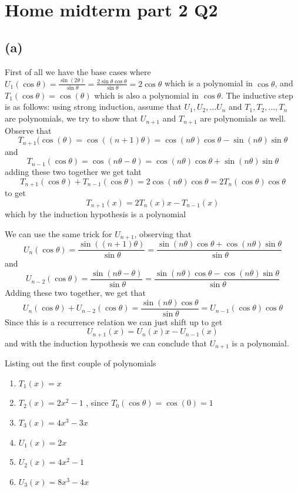 \documentclass[12pt]{article}
\begin{document}
\section*{Home midterm part 2 Q2}
\subsection*{(a)}
First of all we have the base cases where $U_1 (\cos \theta) = \frac{\sin(2 \theta)}{\sin \theta} = \frac{2 \sin \theta \cos \theta}{\sin \theta} = 2 \cos \theta$ which  is a polynomial in $\cos \theta$, and $T_1( \cos \theta) = \cos(\theta)$ which is also a polynomial in $\cos \theta$. The inductive step is as follows: using strong induction, assume that $U_1, U_2, \ldots U_n$ and $T_1, T_2, \ldots, T_n$ are polynomials, we try to show that $U_{n+1}$ and $T_{n+1}$ are polynomials as well. Observe that 
$$
T_{n+1}(\cos(\theta) = \cos ((n+1)\theta) = \cos(n\theta)\cos\theta - \sin(n\theta)\sin\theta
$$
and 
$$T_{n-1}(\cos\theta) = \cos(n\theta - \theta) = \cos(n\theta)\cos\theta + \sin(n\theta)\sin\theta$$
adding these two together we get taht 
$$ T_{n+1}(\cos \theta) + T_{n-1} (\cos \theta) = 2 \cos( n \theta)\cos\theta = 2 T_{n}(\cos \theta)\cos\theta$$
to get
$$T_{n+1} (x) = 2T_n (x) x - T_{n-1}(x)$$
which by the induction hypothesis is a polynomial

We can use the same trick for $U_{n+1}$, observing that 
$$U_{n}(\cos\theta) = \frac{\sin((n+1)\theta)}{\sin\theta} = \frac{\sin(n\theta) \cos \theta + \cos(n\theta)\sin\theta}{\sin\theta}$$
and 
$$U_{n-2}(\cos\theta) = \frac{\sin(n\theta - \theta)}{\sin\theta} = \frac{\sin(n \theta)\cos\theta - \cos(n\theta)\sin\theta}{\sin\theta}
$$
Adding these two together, we get that 
$$U_n(\cos\theta) + U_{n-2}(\cos\theta) = \frac{\sin(n\theta)\cos\theta}{\sin\theta} = U_{n-1}(\cos\theta)\cos\theta$$
Since this is a recurrence relation we can just shift up to get
$$U_{n+1}(x)  = U_n(x)x - U_{n-1}(x)$$
and with the induction hypothesis we can conclude that $U_{n+1}$ is a polynomial.


Listing out the first couple of polynomials
\begin{enumerate}
	\item $T_1(x) = x$
	\item $T_2(x) = 2x^2-1 $ , since $T_0(\cos\theta) = \cos(0) = 1$
	\item $T_3(x) = 4x^3 - 3x$
	\item $U_1(x) = 2x$
	\item $U_2(x) = 4x^2 -1$
	\item $U_3(x) = 8x^3 - 4x$
\end{enumerate}
\end{document}
